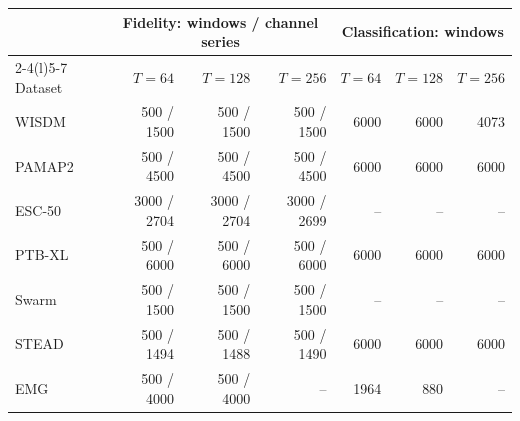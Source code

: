 \begin{tabular}{@{}lrrrrrr@{}}
\toprule
& \multicolumn{3}{c}{Fidelity: windows / channel series} & \multicolumn{3}{c}{Classification: windows} \\ \cmidrule(lr){2-4}\cmidrule(l){5-7}
Dataset & $T=64$ & $T=128$ & $T=256$ & $T=64$ & $T=128$ & $T=256$ \\
\midrule
WISDM & 500 / 1500 & 500 / 1500 & 500 / 1500 & 6000 & 6000 & 4073 \\
PAMAP2 & 500 / 4500 & 500 / 4500 & 500 / 4500 & 6000 & 6000 & 6000 \\
ESC-50 & 3000 / 2704 & 3000 / 2704 & 3000 / 2699 & -- & -- & -- \\
PTB-XL & 500 / 6000 & 500 / 6000 & 500 / 6000 & 6000 & 6000 & 6000 \\
Swarm & 500 / 1500 & 500 / 1500 & 500 / 1500 & -- & -- & -- \\
STEAD & 500 / 1494 & 500 / 1488 & 500 / 1490 & 6000 & 6000 & 6000 \\
EMG & 500 / 4000 & 500 / 4000 & -- & 1964 & 880 & -- \\
\bottomrule
\end{tabular}
